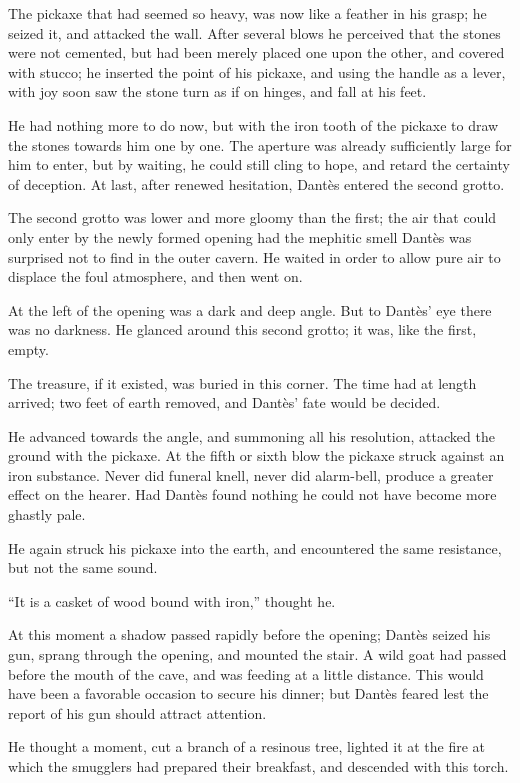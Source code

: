 The pickaxe that had seemed so heavy, was now like a feather in his
grasp; he seized it, and attacked the wall. After several blows he
perceived that the stones were not cemented, but had been merely placed
one upon the other, and covered with stucco; he inserted the point of
his pickaxe, and using the handle as a lever, with joy soon saw the
stone turn as if on hinges, and fall at his feet.

He had nothing more to do now, but with the iron tooth of the pickaxe
to draw the stones towards him one by one. The aperture was already
sufficiently large for him to enter, but by waiting, he could still
cling to hope, and retard the certainty of deception. At last, after
renewed hesitation, Dantès entered the second grotto.

The second grotto was lower and more gloomy than the first; the air
that could only enter by the newly formed opening had the mephitic
smell Dantès was surprised not to find in the outer cavern. He waited
in order to allow pure air to displace the foul atmosphere, and then
went on.

At the left of the opening was a dark and deep angle. But to Dantès’
eye there was no darkness. He glanced around this second grotto; it
was, like the first, empty.

The treasure, if it existed, was buried in this corner. The time had at
length arrived; two feet of earth removed, and Dantès’ fate would be
decided.

He advanced towards the angle, and summoning all his resolution,
attacked the ground with the pickaxe. At the fifth or sixth blow the
pickaxe struck against an iron substance. Never did funeral knell,
never did alarm-bell, produce a greater effect on the hearer. Had
Dantès found nothing he could not have become more ghastly pale.

He again struck his pickaxe into the earth, and encountered the same
resistance, but not the same sound.

“It is a casket of wood bound with iron,” thought he.

At this moment a shadow passed rapidly before the opening; Dantès
seized his gun, sprang through the opening, and mounted the stair. A
wild goat had passed before the mouth of the cave, and was feeding at a
little distance. This would have been a favorable occasion to secure
his dinner; but Dantès feared lest the report of his gun should attract
attention.

He thought a moment, cut a branch of a resinous tree, lighted it at the
fire at which the smugglers had prepared their breakfast, and descended
with this torch.

